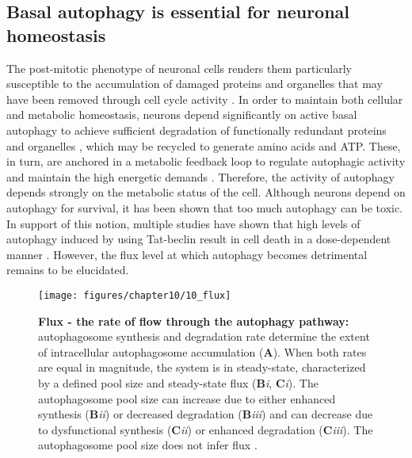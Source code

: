 \subsection{Basal autophagy is essential for neuronal homeostasis}
The post-mitotic phenotype of neuronal cells renders them particularly susceptible to the accumulation of damaged proteins and organelles that may have been removed through cell cycle activity \citep{Liang2014,Tan2014}. In order to maintain both cellular and metabolic homeostasis, neurons depend significantly on active basal autophagy to achieve sufficient degradation of functionally redundant proteins and organelles \citep{Meijer2009}, which may be recycled to generate amino acids and ATP. These, in turn, are anchored in a metabolic feedback loop to regulate autophagic activity and maintain the high energetic demands \citep{Loos2013}. Therefore, the activity of autophagy depends strongly on the metabolic status of the cell. Although neurons depend on autophagy for survival, it has been shown that too much autophagy can be toxic. In support of this notion, multiple studies have shown that high levels of autophagy induced by using Tat-beclin result in cell death in a dose-dependent manner \citep{Liu2013,Liu2015}. However, the flux level at which autophagy becomes detrimental remains to be elucidated. 

\begin{figure}[H]
  \center
  \texttt{[image: figures/chapter10/10\_flux]}
  \caption[Flux - the rate of flow through the autophagy pathway]{\textbf{Flux - the rate of flow through the autophagy pathway:} autophagosome synthesis and degradation rate determine the extent of intracellular autophagosome accumulation (\textbf{A}). When both rates are equal in magnitude, the system is in steady-state, characterized by a defined pool size and steady-state flux (\textbf{B}\textit{i}, \textbf{C}\textit{i}). The autophagosome pool size can increase due to either enhanced synthesis (\textbf{B}\textit{ii}) or decreased degradation (\textbf{B}\textit{iii}) and can decrease due to dysfunctional synthesis (\textbf{C}\textit{ii}) or enhanced degradation (\textbf{C}\textit{iii}). The autophagosome pool size does not infer flux \citep{lumkwana2017}.}
  \label{fig:10_flux}
\end{figure}

